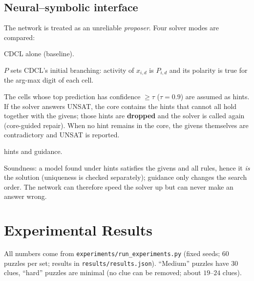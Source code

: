 \documentclass[12pt,a4paper]{article}
\begin{document}
\subsection{Neural--symbolic interface}
The network is treated as an unreliable \emph{proposer}. Four solver modes are compared:
\begin{description}[nosep]
  \item[plain] CDCL alone (baseline).
  \item[guided] $P$ sets CDCL's initial branching: activity of $x_{i,d}$ is $P_{i,d}$ and its polarity is true for the arg-max digit of each cell.
  \item[hints] The cells whose top prediction has confidence $\ge\tau$ ($\tau=0.9$) are assumed as hints. If the solver answers UNSAT, the core contains the hints that
        cannot all hold together with the givens; those hints are \textbf{dropped} and the solver is called again (core-guided repair). When no hint remains in the core, the
        givens themselves are contradictory and UNSAT is reported.
  \item[both] hints and guidance.
\end{description}
Soundness: a model found under hints satisfies the givens and all rules, hence it \emph{is} the solution (uniqueness is checked separately); guidance only changes the search order.
The network can therefore speed the solver up but can never make an answer wrong.

\section{Experimental Results}
All numbers come from \texttt{experiments/run\_experiments.py} (fixed seeds; $60$ puzzles per set; results in \texttt{results/results.json}). ``Medium'' puzzles have $30$ clues, ``hard'' puzzles
are minimal (no clue can be removed; about $19$--$24$ clues).
\end{document}
